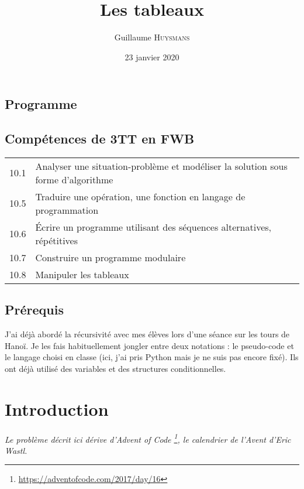 
\title{Les tableaux}
\author{Guillaume \textsc{Huysmans}}%
\date{23 janvier 2020}

\maketitle

\begin{teacheronly}
\section*{Programme}
\subsection*{Compétences de 3TT en FWB}
\begin{tabular}{l|l}
10.1 & Analyser une situation-problème et
	modéliser la solution sous forme d'algorithme \\
10.5 & Traduire une opération, une fonction en langage de programmation \\
10.6 & Écrire un programme utilisant des séquences alternatives, répétitives \\
10.7 & Construire un programme modulaire \\
10.8 & Manipuler les tableaux
\end{tabular}
\subsection*{Prérequis}
J'ai déjà abordé la récursivité avec mes élèves lors d'une séance sur les tours
de Hanoï. Je les fais habituellement jongler entre deux notations : le
pseudo-code et le langage choisi en classe (ici, j'ai pris Python mais je ne
suis pas encore fixé).
Ils ont déjà utilisé des variables et des structures conditionnelles.
\end{teacheronly}

\section{Introduction}

\emph{Le problème décrit ici dérive d'Advent of Code
\footnote{\url{https://adventofcode.com/2017/day/16}},
le calendrier de l'Avent d'Eric Wastl.}

